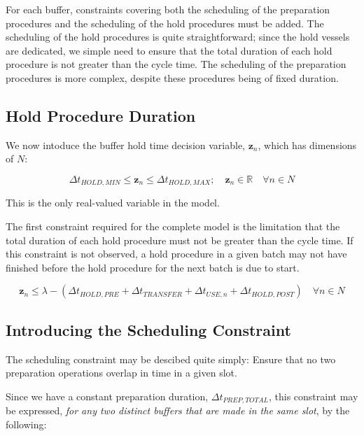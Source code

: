 For each buffer, constraints covering both the scheduling of the preparation procedures and the scheduling of the hold procedures must be added.
The scheduling of the hold procedures is quite straightforward; since the hold
vessels are dedicated, we simple need to ensure that the total duration of each
hold procedure is not greater than the cycle time.
The scheduling of the preparation procedures is more complex, despite these
procedures being of fixed duration.

\subsection{Hold Procedure Duration}\label{SS.constr5}

We now intoduce the buffer hold time decision variable, $\boldsymbol{z}_{n}$,
which has dimensions of $N$:

\begin{equation}
    \Delta t_{HOLD,MIN} \le \boldsymbol{z}_{n} \le \Delta t_{HOLD,MAX}; \quad
    \boldsymbol{z}_{n} \in \mathbb{R} \quad \forall n \in N
    \label{eq.z}
\end{equation}

This is the only real-valued variable in the model.

The first constraint required for the complete model is the limitation that the
total duration of each hold procedure must not be greater than the cycle time.
If this constraint is not observed, a hold procedure in a given batch may not
have finished before the hold procedure for the next batch is due to start.

\begin{equation}
    \boldsymbol{z}_{n} \le \lambda - \left( \Delta t_{HOLD,PRE} +
    \Delta t_{TRANSFER} + \Delta t_{USE,n} + \Delta t_{HOLD,POST} \right)
    \quad \forall n \in N
    \label{eq.constr5}
\end{equation}

\subsection{Introducing the Scheduling Constraint}\label{SS.schedintro}

The scheduling constraint may be descibed quite simply:
Ensure that no two preparation operations overlap in time in a given slot.

Since we have a constant preparation duration, $ \Delta t_{PREP,TOTAL} $, this
constraint may be expressed, \emph{for any two distinct buffers that are made
in the same slot}, by the following:

